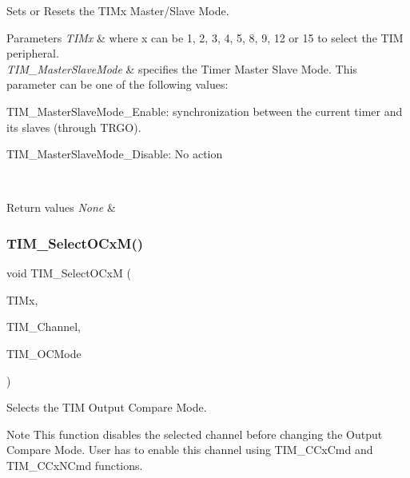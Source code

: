 Sets or Resets the T\+I\+Mx Master/\+Slave Mode. 


\begin{DoxyParams}{Parameters}
{\em T\+I\+Mx} & where x can be 1, 2, 3, 4, 5, 8, 9, 12 or 15 to select the T\+IM peripheral. \\
\hline
{\em T\+I\+M\+\_\+\+Master\+Slave\+Mode} & specifies the Timer Master Slave Mode. This parameter can be one of the following values\+: \begin{DoxyItemize}
\item T\+I\+M\+\_\+\+Master\+Slave\+Mode\+\_\+\+Enable\+: synchronization between the current timer and its slaves (through T\+R\+GO). \item T\+I\+M\+\_\+\+Master\+Slave\+Mode\+\_\+\+Disable\+: No action \end{DoxyItemize}
\\
\hline
\end{DoxyParams}

\begin{DoxyRetVals}{Return values}
{\em None} & \\
\hline
\end{DoxyRetVals}
\mbox{\label{group___t_i_m___private___functions_ga83ea0af5a7c1af521236ce5e4d2c42b0}} 
\subsubsection{\texorpdfstring{TIM\_SelectOCxM()}{TIM\_SelectOCxM()}}
{\footnotesize\ttfamily void T\+I\+M\+\_\+\+Select\+O\+CxM (\begin{DoxyParamCaption}\item[{\mbox{\hyperlink{struct_t_i_m___type_def}{T\+I\+M\+\_\+\+Type\+Def}} $\ast$}]{T\+I\+Mx,  }\item[{uint16\+\_\+t}]{T\+I\+M\+\_\+\+Channel,  }\item[{uint16\+\_\+t}]{T\+I\+M\+\_\+\+O\+C\+Mode }\end{DoxyParamCaption})}



Selects the T\+IM Output Compare Mode. 

\begin{DoxyNote}{Note}
This function disables the selected channel before changing the Output Compare Mode. User has to enable this channel using T\+I\+M\+\_\+\+C\+Cx\+Cmd and T\+I\+M\+\_\+\+C\+Cx\+N\+Cmd functions. 
\end{DoxyNote}

